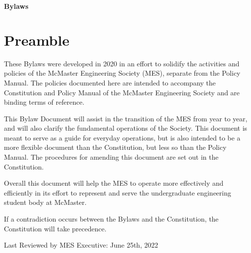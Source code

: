 
\vspace*{10pt}
\hfill {\Huge \textbf{Bylaws}}

\vspace*{25pt}

\section*{Preamble}

These Bylaws were developed in 2020 in an effort to solidify the activities and policies of the McMaster Engineering Society (MES), separate from the Policy Manual. The policies documented here are intended to accompany the Constitution and Policy Manual of the McMaster Engineering Society and are binding terms of reference.

This Bylaw Document will assist in the transition of the MES from year to year, and will also clarify the fundamental operations of the Society. This document is meant to serve as a guide for everyday operations, but is also intended to be a more flexible document than the Constitution, but less so than the Policy Manual. The procedures for amending this document are set out in the Constitution.

Overall this document will help the MES to operate more effectively and efficiently in its effort to represent and serve the undergraduate engineering student body at McMaster.

If a contradiction occurs between the Bylaws and the Constitution, the Constitution will take precedence.

\vfill

Last Reviewed by MES Executive: June 25th, 2022
\vspace{25pt}